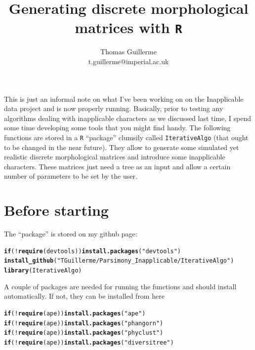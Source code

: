 \documentclass{article}\usepackage[]{graphicx}\usepackage[]{color}
\makeatletter
\newcommand{\hlstr}[1]{\textcolor[rgb]{0.192,0.494,0.8}{#1}}%
\newcommand{\hlopt}[1]{\textcolor[rgb]{0,0,0}{#1}}%
\newcommand{\hlstd}[1]{\textcolor[rgb]{0.345,0.345,0.345}{#1}}%
\newcommand{\hlkwa}[1]{\textcolor[rgb]{0.161,0.373,0.58}{\textbf{#1}}}%
\newcommand{\hlkwd}[1]{\textcolor[rgb]{0.737,0.353,0.396}{\textbf{#1}}}%
\newenvironment{kframe}{%
 \def\at@end@of@kframe{}%
 \ifinner\ifhmode%
  \def\at@end@of@kframe{\end{minipage}}%
  \begin{minipage}{\columnwidth}%
 \fi\fi%
 \def\FrameCommand##1{\hskip\@totalleftmargin \hskip-\fboxsep
 \colorbox{shadecolor}{##1}\hskip-\fboxsep
     \hskip-\linewidth \hskip-\@totalleftmargin \hskip\columnwidth}%
 \MakeFramed {\advance\hsize-\width
   \@totalleftmargin\z@ \linewidth\hsize
   \@setminipage}}%
 {\par\unskip\endMakeFramed%
 \at@end@of@kframe}
\newenvironment{knitrout}{}{} %
\newcommand{\R}{\texttt{R} }
\makeatother
\begin{document}
\title{Generating discrete morphological matrices with \R}

\author{Thomas Guillerme \\ t.guillerme@imperial.ac.uk}


\maketitle

This is just an informal note on what I've been working on on the Inapplicable data project and is now properly running.
Basically, prior to testing any algorithms dealing with inapplicable characters as we discussed last time, I spend some time developing some tools that you might find handy.
The following functions are stored in a \R ``package'' clumsily called \texttt{IterativeAlgo} (that ought to be changed in the near future).
They allow to generate some simulated yet realistic discrete morphological matrices and introduce some inapplicable characters.
These matrices just need a tree as an input and allow a certain number of parameters to be set by the user.

\section{Before starting}

The ``package'' is stored on my github page:

\begin{knitrout}
\color{fgcolor}\begin{kframe}
\begin{alltt}
\hlkwa{if}\hlstd{(}\hlopt{!}\hlkwd{require}\hlstd{(devtools))} \hlkwd{install.packages}\hlstd{(}\hlstr{"devtools"}\hlstd{)}
\hlkwd{install_github}\hlstd{(}\hlstr{"TGuillerme/Parsimony_Inapplicable/IterativeAlgo"}\hlstd{)}
\hlkwd{library}\hlstd{(IterativeAlgo)}
\end{alltt}
\end{kframe}
\end{knitrout}

A couple of packages are needed for running the functions and should install automatically.
If not, they can be installed from here
\begin{knitrout}
\color{fgcolor}\begin{kframe}
\begin{alltt}
\hlkwa{if}\hlstd{(}\hlopt{!}\hlkwd{require}\hlstd{(ape))} \hlkwd{install.packages}\hlstd{(}\hlstr{"ape"}\hlstd{)}
\hlkwa{if}\hlstd{(}\hlopt{!}\hlkwd{require}\hlstd{(ape))} \hlkwd{install.packages}\hlstd{(}\hlstr{"phangorn"}\hlstd{)}
\hlkwa{if}\hlstd{(}\hlopt{!}\hlkwd{require}\hlstd{(ape))} \hlkwd{install.packages}\hlstd{(}\hlstr{"phyclust"}\hlstd{)}
\hlkwa{if}\hlstd{(}\hlopt{!}\hlkwd{require}\hlstd{(ape))} \hlkwd{install.packages}\hlstd{(}\hlstr{"diversitree"}\hlstd{)}
\end{alltt}
\end{kframe}
\end{knitrout}
\end{document}
